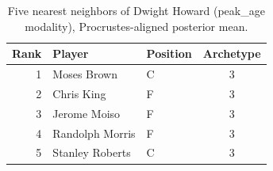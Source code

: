 \begin{table}[htbp]
  \centering\small
  \begin{tabular}{rllc}
    \toprule
    Rank & Player & Position & Archetype \\
    \midrule
    1 & Moses Brown & C & 3 \\
    2 & Chris King & F & 3 \\
    3 & Jerome Moiso & F & 3 \\
    4 & Randolph Morris & F & 3 \\
    5 & Stanley Roberts & C & 3 \\
    \bottomrule
  \end{tabular}
  \caption{Five nearest neighbors of Dwight Howard (peak_age modality), Procrustes-aligned posterior mean.}
  \label{tab:Dwight_Howard_neighbors_peak_age}
\end{table}

